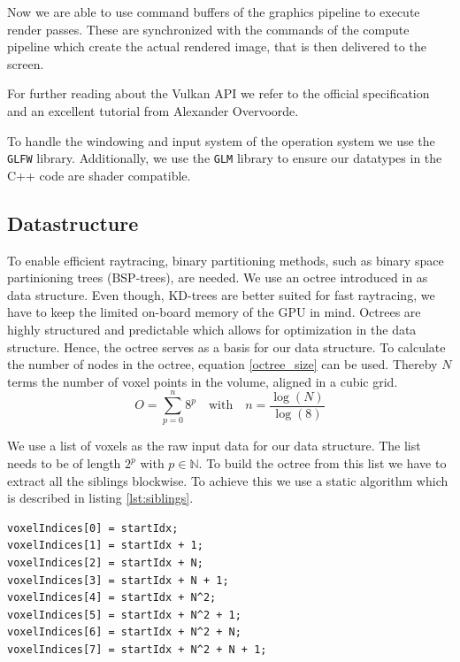 \documentclass[12pt,conference]{IEEEtran}
\begin{document}
\par
Now we are able to use command buffers of the graphics pipeline to execute render passes. These are synchronized with the commands of the compute pipeline which create the actual rendered image, that is then delivered to the screen.
\par
For further reading about the Vulkan API we refer to the official specification\cite{vulkan1.0.38spec} and an excellent tutorial from Alexander Overvoorde\cite{overvoorde2016vulkan}.
\par
To handle the windowing and input system of the operation system we use the \texttt{GLFW} library\cite{loewy2016glfw}. Additionally, we use the \texttt{GLM} library\cite{creation2016glm} to ensure our datatypes in the C++ code are shader compatible.

\subsection{Datastructure}
To enable efficient raytracing, binary partitioning methods, such as binary space partinioning trees (BSP-trees), are needed. We use an octree introduced in \cite{meagher1982geometric} as data structure. Even though, KD-trees are better suited for fast raytracing\cite{havran2000heuristic}, we have to keep the limited on-board memory of the GPU in mind. Octrees are highly structured and predictable which allows for optimization in the data structure\cite{crassin2009gigavoxels}.
Hence, the octree serves as a basis for our data structure. To calculate the number of nodes in the octree, equation \ref{octree_size} can be used. Thereby $N$ terms the number of voxel points in the volume, aligned in a cubic grid.
\begin{equation} 
O = \sum\limits_{p=0}^{n} 8^{p} \quad \textrm{with} \quad n = \frac{\log(N)}{\log(8)}
\label{octree_size} 
\end{equation}

We use a list of voxels as the raw input data for our data structure. The list needs to be of length $2^p$ with $p \in \mathbb{N}$. To build the octree from this list we have to extract all the siblings blockwise. To achieve this we use a static algorithm which is described in listing \ref{lst:siblings}.

\begin{lstlisting}[label=lst:siblings, caption={To find the siblings of a given voxel inside the input list we use this static algorithm. Aside from the index of the first voxel we also need the side length of the cubic volume, labeled as $N$ in the above listing.}]
voxelIndices[0] = startIdx;
voxelIndices[1] = startIdx + 1;
voxelIndices[2] = startIdx + N;
voxelIndices[3] = startIdx + N + 1;
voxelIndices[4] = startIdx + N^2;
voxelIndices[5] = startIdx + N^2 + 1;
voxelIndices[6] = startIdx + N^2 + N;
voxelIndices[7] = startIdx + N^2 + N + 1;
\end{lstlisting}
\end{document}
